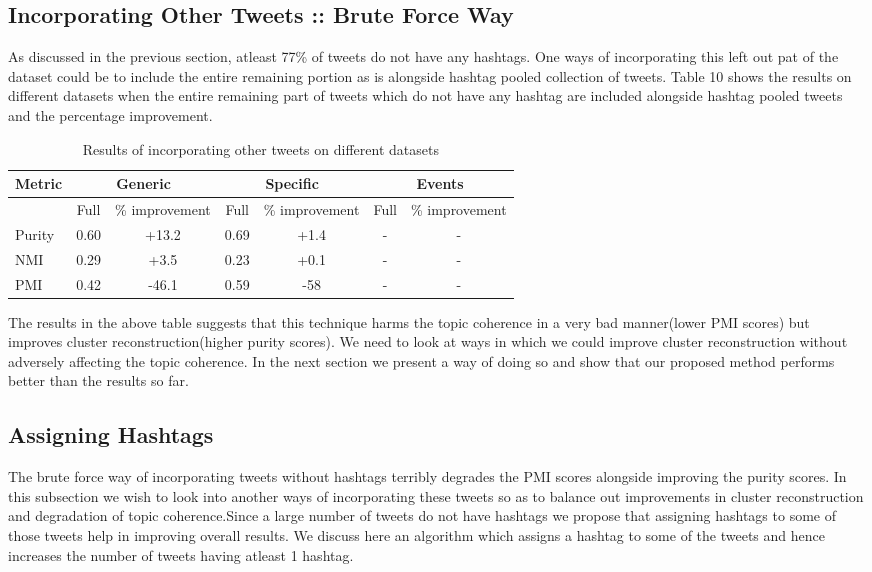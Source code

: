 \documentclass[10pt,a5paper,twoside]{article}
\begin{document}
\subsection{Incorporating Other Tweets :: Brute Force Way}

As discussed in the previous section, atleast 77\% of tweets do not have any hashtags. One ways of incorporating this left out pat of the dataset could be to include the entire remaining portion as is alongside hashtag pooled collection of tweets. Table 10 shows the results on different datasets when the entire remaining part of tweets which do not have any hashtag are included alongside hashtag pooled tweets and the percentage improvement. 

\begin{table}[!h]
\setcounter{table}{9}
\centering
	\begin{tabular}{|l|cc|cc|cc|}
	\hline
	Metric  & \multicolumn {2}{c}{Generic} & \multicolumn {2}{c}{Specific} & \multicolumn {2}{c}{Events}\\
	\hline
	 & Full & \% improvement & Full & \% improvement & Full & \% improvement\\
	\hline
	Purity & 0.60 & +13.2 & 0.69 & +1.4 & - & - \\
	\hline
	NMI & 0.29 & +3.5 & 0.23 & +0.1 & - & - \\
	\hline
	PMI & 0.42 & -46.1 & 0.59 & -58 & - & - \\
	\hline
	\end{tabular}
\caption{Results of incorporating other tweets on different datasets}\label{Table}
\end{table}

The results in the above table suggests that this technique harms the topic coherence in a very bad manner(lower PMI scores) but improves cluster reconstruction(higher purity scores). We need to look at ways in which we could improve cluster reconstruction without adversely affecting the topic coherence. In the next section we present a way of doing so and show that our proposed method performs better than the results so far.

\subsection{Assigning Hashtags}
The brute force way of incorporating tweets without hashtags terribly degrades the PMI scores alongside improving the purity scores. In this subsection we wish to look into another ways of incorporating these tweets so as to balance out improvements in cluster reconstruction and degradation of topic coherence.Since a large number of tweets do not have hashtags we propose that assigning hashtags to some of those tweets help in improving overall results. We discuss here an algorithm which assigns a hashtag to some of the tweets and hence increases the number of tweets having atleast 1 hashtag.
\end{document}
